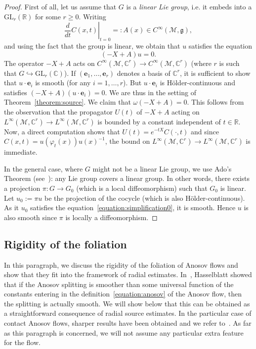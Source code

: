 \documentclass[AHL,Unicode,longabstracts,published]{cedram}
\newcommand{\C}{\mathbb{C}}
\newcommand{\R}{\mathbb{R}}
\newcommand{\bfe}{\mathbf{e}}
\newcommand{\M}{\mathcal{M}}
\newcommand{\fkg}{\mathfrak{g}}
\newcommand{\GL}{\mathrm{GL}}
\begin{document}
\begin{proof}
First of all, let us assume that $G$ is a \emph{linear Lie group}, i.e. it embeds into a $\GL_r(\R)$ for some $r \geq 0$. Writing
\[
\left. \dfrac{d}{dt} C(x,t)\right|_{t=0} =: A(x) \in C^\infty(\M,\fkg),
\]
and using the fact that the group is linear, we obtain that $u$ satisfies the equation
\begin{equation}\label{equation:simplification0}
(-X+A)u = 0.
\end{equation}
The operator $-X+A$ acts on $C^\infty(\M,\C^r) \rightarrow C^\infty(\M,\C^r)$ (where $r$ is such that $G \hookrightarrow \GL_r(\C)$). If $(\bfe_1,\dots, \bfe_r)$ denotes a basis of $\C^r$, it is sufficient to show that $u \cdot \bfe_i$ is smooth (for any $i=1,\dots,r$). But $u \cdot \bfe_i$ is H\"older-continuous and satisfies $(-X+A)(u \cdot \bfe_i) = 0$. We are thus in the setting of Theorem~\ref{theorem:source}. We claim that $\omega(-X+A)=0$. This follows from the observation that the propagator $U(t)$ of $-X+A$ acting on $L^\infty(\M,\C^r) \rightarrow L^\infty(\M,\C^r)$ is bounded by a constant independent of $t \in \R$. Now, a direct computation shows that $U(t) = e^{-tX} C(\cdot,t)$ and since $C(x,t) = u(\varphi_t (x))u(x)^{-1}$, the bound on $L^\infty(\M,\C^r) \rightarrow L^\infty(\M,\C^r)$ is immediate.


In the general case, where $G$ might not be a linear Lie group, we use Ado's Theorem (see~\cite[Conclusion 5.26]{Hall-15}): any Lie group covers a linear group. In other words, there exists a projection $\pi : G \rightarrow G_0$ (which is a local diffeomorphism) such that $G_0$ is linear. Let $u_0 := \pi u$ be the projection of the cocycle (which is also H\"older-continuous). As it $u_0$ satisfies the equation~\eqref{equation:simplification0}, it is smooth. Hence $u$ is also smooth since $\pi$ is locally a diffeomorphism.
\end{proof}



\subsection{Rigidity of the foliation}

In this paragraph, we discuss the rigidity of the foliation of Anosov flows and show that they fit into the framework of radial estimates. In~\cite{Hasselblatt-92}, Hasselblatt showed that if the Anosov splitting is smoother than some universal function of the constants entering in the definition~\eqref{equation:anosov} of the Anosov flow, then the splitting is actually smooth. We will show below that this can be obtained as a straightforward consequence of radial source estimates. In the particular case of contact Anosov flows, sharper results have been obtained and we refer to~\cite{Benoist-Foulon-Labourie-90, Benoist-Foulon-Labourie-92,Hurder-Katok-90}. As far as this paragraph is concerned, we will not assume any particular extra feature for the flow.
\end{document}
